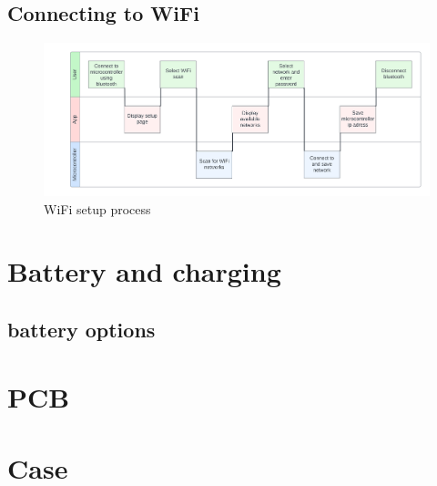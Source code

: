 \subsection{Connecting to WiFi}
\begin{figure}[!h]
    \centering
    \includegraphics[width= \textwidth]{Report/detail_design/fig/wifi_connect.png}
    \caption{WiFi setup process}
    \label{fig:wifi_setup}
\end{figure}

\section{Battery and charging}
\label{sec:battery}
\subsection{battery options}

\section{PCB}

\section{Case}
